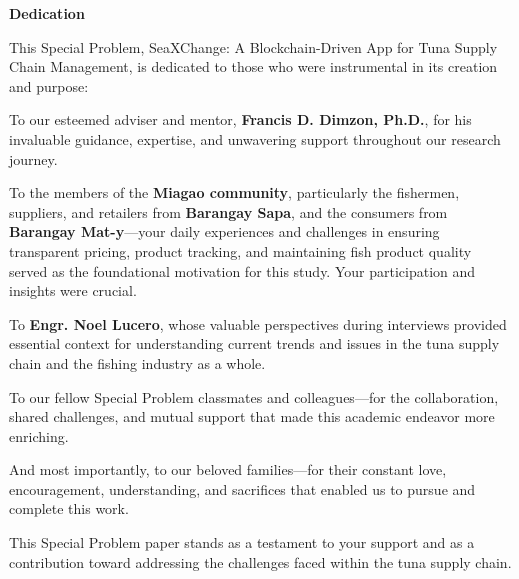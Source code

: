 \begin{center}
	\textbf{Dedication}
\end{center}

This Special Problem, SeaXChange: A Blockchain-Driven App for Tuna Supply Chain Management, is dedicated to those who were instrumental in its creation and purpose:

To our esteemed adviser and mentor, \textbf{Francis D. Dimzon, Ph.D.}, for his invaluable guidance, expertise, and unwavering support throughout our research journey.

To the members of the \textbf{Miagao community}, particularly the fishermen, suppliers, and retailers from \textbf{Barangay Sapa}, and the consumers from \textbf{Barangay Mat-y}—your daily experiences and challenges in ensuring transparent pricing, product tracking, and maintaining fish product quality served as the foundational motivation for this study. Your participation and insights were crucial.

To \textbf{Engr. Noel Lucero}, whose valuable perspectives during interviews provided essential context for understanding current trends and issues in the tuna supply chain and the fishing industry as a whole.

To our fellow Special Problem classmates and colleagues—for the collaboration, shared challenges, and mutual support that made this academic endeavor more enriching.

And most importantly, to our beloved families—for their constant love, encouragement, understanding, and sacrifices that enabled us to pursue and complete this work.

This Special Problem paper stands as a testament to your support and as a contribution toward addressing the challenges faced within the tuna supply chain.
